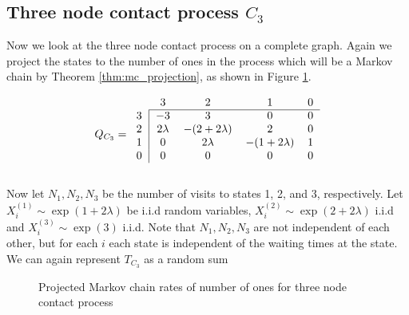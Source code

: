\documentclass{article}
\theoremstyle{plain}
\theoremstyle{definition}
\theoremstyle{remark}
\numberwithin{equation}{section}
\begin{document}
\subsection{Three node contact process \texorpdfstring{$C_3$}{C3}}
Now we look at the three node contact process on a complete graph.
Again we project the states to the number of ones in the process which will be a Markov chain by Theorem \ref{thm:mc_projection}, as shown in Figure \ref{fig:mc_three_contact}.

\begin{equation}
Q_{C_3} = \begin{blockarray}{ccccc}
    & 3 & 2 & 1 & 0\\
    \begin{block}{c|cccc}
    \cline{2-5}
        3 & -3 & 3 & 0 & 0 \\
        2 & 2\lambda & -(2 + 2 \lambda) &
        2 & 0\\
        1 & 0 & 2\lambda & -(1 + 2\lambda) & 1\\
    0 & 0 & 0 & 0 & 0\\
    \end{block}
\end{blockarray}
\end{equation}

Now let $N_1, N_2, N_3$ be the number of visits to states 1, 2, and 3, respectively.
Let $X_i^{(1)} \sim \exp(1 + 2\lambda)$ be i.i.d random variables, $X_i^{(2)} \sim \exp(2 + 2\lambda)$ i.i.d and $X_i^{(3)} \sim \exp(3)$ i.i.d.
Note that $N_1, N_2, N_3$ are not independent of each other, but for each $i$ each state is independent of the waiting times at the state.
We can again represent $T_{C_3}$ as a random sum

\begin{figure}[H]
    \centering
    \caption{Projected Markov chain rates of number of ones for three node contact process}
    \label{fig:mc_three_contact}
\end{figure}
\end{document}
